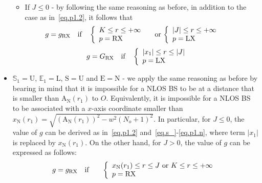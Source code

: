 \documentclass[10pt,journal,a4paper]{IEEEtran}
\begin{document}
\begin{itemize}
\begin{itemize}
		\item If $J \leq 0$ - by following the same reasoning as before, in addition to the case as in~\eqref{eq.p1.2}, it follows that
	\begin{equation}\label{eq.s_}
		\hspace{-10mm}g = g_\mathrm{RX} \quad \text{if} \quad \left\{ 
			\begin{array}{l l}
				K \leq r \leq +\infty & \\
				p = \mathrm{RX} & 
				\end{array} \right. \,\text{or}\, \left\{ 
			\begin{array}{l l}
				|J| \leq r \leq +\infty & \\
				p = \mathrm{LX} & 
				\end{array} \right.\hspace{-5mm}
	\end{equation}
	\begin{equation}\label{eq.p1.n}
		g = G_\mathrm{RX} \quad \text{if} \quad \left\{ 
			\begin{array}{l l}
				|x_1| \leq r \leq |J| & \\
				p = \mathrm{LX} & 
				\end{array} \right.
	\end{equation}
	\end{itemize}
	\item $\mathbb{S}_1 = \mathrm{U}$, $\mathbb{E}_1 = \mathrm{L}$, $\mathrm{S} = \mathrm{U}$ and $\mathrm{E} = \mathrm{N}$ - we apply the same reasoning as before by bearing in mind that it is impossible for a NLOS BS to be at a distance that is smaller than $\mathrm{A}_\mathrm{N}(r_1)$ to $O$. Equivalently, it is impossible for a NLOS BS to be associated with a $x$-axis coordinate smaller than $x_\mathrm{N}(r_1) = \sqrt{(\mathrm{A}_\mathrm{N}(r_1))^2 - w^2(N_o+1)^2}$. In particular, for $J \leq 0$, the value of $g$ can be derived as in~\eqref{eq.p1.2} and~\eqref{eq.s_}-\eqref{eq.p1.n}, where term $|x_1|$ is replaced by $x_\mathrm{N}(r_1)$. On the other hand, for $J > 0$, the value of $g$ can be expressed as follows:
    \setlength{\arraycolsep}{0.0em}
	\begin{eqnarray}
		\hspace{-2mm}g = g_\mathrm{RX} \quad &\text{if}& \quad \left\{ 
			\begin{array}{l l}
				x_\mathrm{N}(r_1) \leq r \leq J  \,\,\text{or} \,\,K \leq r \leq +\infty& \\
				p = \mathrm{RX} & 
				\end{array} \right.\hspace{-5mm}\notag\\

\end{eqnarray}
\end{itemize}
\end{document}
